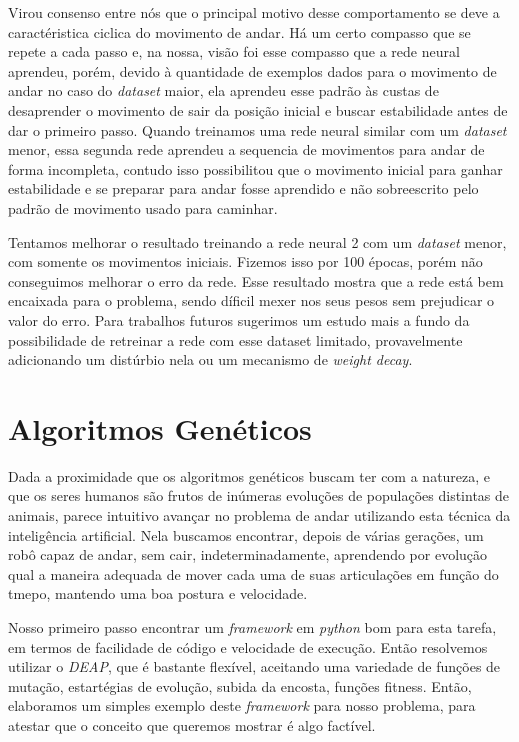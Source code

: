 \documentclass[twoside,conference,a4paper]{IEEEtran}
\begin{document}
Virou consenso entre nós que o principal motivo desse comportamento se deve a caractéristica ciclica do movimento de andar. Há um certo compasso que se repete a cada passo e, na nossa, visão foi esse compasso que a rede neural aprendeu, porém, devido à quantidade de exemplos dados para o movimento de andar no caso do \textsl{dataset} maior, ela aprendeu esse padrão às custas de desaprender o movimento de sair da posição inicial e buscar estabilidade antes de dar o primeiro passo. Quando treinamos uma rede neural similar com um \textsl{dataset} menor, essa segunda rede aprendeu a sequencia de movimentos para andar de forma incompleta, contudo isso possibilitou que o movimento inicial para ganhar estabilidade e se preparar para andar fosse aprendido e não sobreescrito pelo padrão de movimento usado para caminhar.

Tentamos melhorar o resultado treinando a rede neural 2 com um \textsl{dataset} menor, com somente os movimentos iniciais. Fizemos isso por 100 épocas, porém não conseguimos melhorar o erro da rede. Esse resultado mostra que a rede está bem encaixada para o problema, sendo díficil mexer nos seus pesos sem prejudicar o valor do erro. Para trabalhos futuros sugerimos um estudo mais a fundo da possibilidade de retreinar a rede com esse dataset limitado, provavelmente adicionando um distúrbio nela ou um mecanismo de \textsl{weight decay}\cite{hastie01statisticallearning}.


\section{Algoritmos Genéticos} \label{algoritmos_geneticos}

Dada a proximidade que os algoritmos genéticos buscam ter com a natureza, e que os seres humanos são frutos de inúmeras evoluções de populações distintas de animais, parece intuitivo avançar no problema de andar utilizando esta técnica da inteligência artificial. Nela buscamos encontrar, depois de várias gerações, um robô capaz de andar, sem cair, indeterminadamente, aprendendo por evolução qual a maneira adequada de mover cada uma de suas articulações em função do tmepo, mantendo uma boa postura e velocidade.

Nosso primeiro passo encontrar um \textsl{framework} em \textsl{python} bom para esta tarefa, em termos de facilidade de código e velocidade de execução. Então resolvemos utilizar o \textsl{DEAP}\cite{deap}, que é bastante flexível, aceitando uma variedade de funções de mutação, estartégias de evolução, subida da encosta, funções fitness. Então, elaboramos um simples exemplo deste \textsl{framework} para nosso problema, para atestar que o conceito que queremos mostrar é algo factível.
\end{document}
